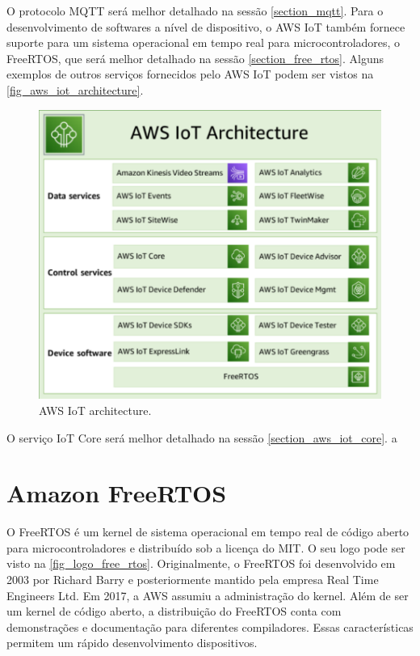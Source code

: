 \documentclass[
    12pt,
    openright,
    twoside,
    a4paper,
    english,
    spanish,
    brazil,
    ]{abntex2}
\begin{document}
O protocolo MQTT será melhor detalhado na sessão \autoref{section_mqtt}. Para o desenvolvimento de softwares a nível de dispositivo, o AWS IoT também fornece suporte para um sistema operacional em tempo real para microcontroladores, o FreeRTOS, que será melhor detalhado na sessão \autoref{section_free_rtos}. Alguns exemplos de outros serviços fornecidos pelo AWS IoT podem ser vistos na \autoref{fig_aws_iot_architecture}.

\begin{figure}[htb]
	\caption{AWS IoT architecture.}\label{fig_aws_iot_architecture}
	\begin{center}
		\includegraphics[scale=0.7]{Images/aws_iot_architecture.pdf}
	\end{center}
\end{figure}

O serviço IoT Core será melhor detalhado na sessão \autoref{section_aws_iot_core}.
a
\section{Amazon FreeRTOS}\label{section_free_rtos}
O FreeRTOS é um kernel de sistema operacional em tempo real de código aberto para microcontroladores e distribuído sob a licença do MIT. O seu logo pode ser visto na \autoref{fig_logo_free_rtos}. Originalmente, o FreeRTOS foi desenvolvido em 2003 por Richard Barry e posteriormente mantido pela empresa Real Time Engineers Ltd. Em 2017, a AWS assumiu a administração do kernel. Além de ser um kernel de código aberto, a distribuição do FreeRTOS conta com demonstrações e documentação para diferentes compiladores. Essas características permitem um rápido desenvolvimento dispositivos.
\end{document}
